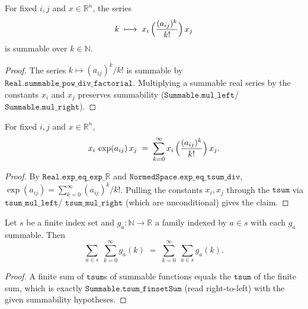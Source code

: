 \begin{lemma}
    \label{lem:quadform-summable-entry}
    \leanok
    For fixed $i, j$ and $x \in \mathbb{R}^n$, the series
    \[
        k \;\longmapsto\; x_i\,\Bigl(\frac{(a_{ij})^k}{k!}\Bigr)\, x_j
    \]
    is summable over $k \in \mathbb{N}$.
\end{lemma}
\begin{proof}
    The series $k \mapsto (a_{ij})^k / k!$ is summable by
    $\texttt{Real.summable\_pow\_div\_factorial}$. Multiplying a summable real
    series by the constants $x_i$ and $x_j$ preserves summability
    ($\texttt{Summable.mul\_left}$/$\texttt{Summable.mul\_right}$).
\end{proof}

\begin{lemma}
    \label{lem:exp-entry-tsum}
    \leanok
    For fixed $i, j$ and $x \in \mathbb{R}^n$,
    \[
        x_i\, \exp(a_{ij})\, x_j \;=\; \sum_{k=0}^{\infty} x_i\,\Bigl(\frac{(a_{ij})^k}{k!}\Bigr)\, x_j .
    \]
\end{lemma}
\begin{proof}
    By $\texttt{Real.exp\_eq\_exp\_ℝ}$ and $\texttt{NormedSpace.exp\_eq\_tsum\_div}$,
    $\exp(a_{ij}) = \sum_{k=0}^{\infty} (a_{ij})^k / k!$. Pulling the constants
    $x_i, x_j$ through the $\texttt{tsum}$ via $\texttt{tsum\_mul\_left}$/
    $\texttt{tsum\_mul\_right}$ (which are unconditional) gives the claim.
\end{proof}

\begin{lemma}
    \label{lem:single-sum-tsum-interchange}
    \leanok
    Let $s$ be a finite index set and $g_a : \mathbb{N} \to \mathbb{R}$ a family
    indexed by $a \in s$ with each $g_a$ summable. Then
    \[
        \sum_{a \in s} \;\sum_{k=0}^{\infty} g_a(k)
        \;=\; \sum_{k=0}^{\infty} \;\sum_{a \in s} g_a(k).
    \]
\end{lemma}
\begin{proof}
    A finite sum of $\texttt{tsum}$s of summable functions equals the
    $\texttt{tsum}$ of the finite sum, which is exactly
    $\texttt{Summable.tsum\_finsetSum}$ (read right-to-left) with the given
    summability hypotheses.
\end{proof}

